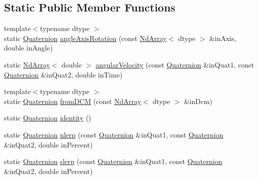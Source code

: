\subsection*{Static Public Member Functions}
\begin{DoxyCompactItemize}
\item 
{\footnotesize template$<$typename dtype $>$ }\\static \mbox{\hyperlink{class_num_c_1_1_rotations_1_1_quaternion}{Quaternion}} \mbox{\hyperlink{class_num_c_1_1_rotations_1_1_quaternion_a2c4e3aaf52ab55b71b07471411ad23bb}{angle\+Axis\+Rotation}} (const \mbox{\hyperlink{class_num_c_1_1_nd_array}{Nd\+Array}}$<$ dtype $>$ \&in\+Axis, double in\+Angle)
\item 
static \mbox{\hyperlink{class_num_c_1_1_nd_array}{Nd\+Array}}$<$ double $>$ \mbox{\hyperlink{class_num_c_1_1_rotations_1_1_quaternion_a850c8173ab8877ba42a8d440af26fcea}{angular\+Velocity}} (const \mbox{\hyperlink{class_num_c_1_1_rotations_1_1_quaternion}{Quaternion}} \&in\+Quat1, const \mbox{\hyperlink{class_num_c_1_1_rotations_1_1_quaternion}{Quaternion}} \&in\+Quat2, double in\+Time)
\item 
{\footnotesize template$<$typename dtype $>$ }\\static \mbox{\hyperlink{class_num_c_1_1_rotations_1_1_quaternion}{Quaternion}} \mbox{\hyperlink{class_num_c_1_1_rotations_1_1_quaternion_a6e66232a5f447ca48e865b2434bd0441}{from\+D\+CM}} (const \mbox{\hyperlink{class_num_c_1_1_nd_array}{Nd\+Array}}$<$ dtype $>$ \&in\+Dcm)
\item 
static \mbox{\hyperlink{class_num_c_1_1_rotations_1_1_quaternion}{Quaternion}} \mbox{\hyperlink{class_num_c_1_1_rotations_1_1_quaternion_a7823fd0bc7e9c2e64e2293e8956367f9}{identity}} ()
\item 
static \mbox{\hyperlink{class_num_c_1_1_rotations_1_1_quaternion}{Quaternion}} \mbox{\hyperlink{class_num_c_1_1_rotations_1_1_quaternion_a9d6996eb1a5a3e0fdeae32bf924bc578}{nlerp}} (const \mbox{\hyperlink{class_num_c_1_1_rotations_1_1_quaternion}{Quaternion}} \&in\+Quat1, const \mbox{\hyperlink{class_num_c_1_1_rotations_1_1_quaternion}{Quaternion}} \&in\+Quat2, double in\+Percent)
\item 
static \mbox{\hyperlink{class_num_c_1_1_rotations_1_1_quaternion}{Quaternion}} \mbox{\hyperlink{class_num_c_1_1_rotations_1_1_quaternion_a70f6f155f1be9ca15b4b1d36ba416c9b}{slerp}} (const \mbox{\hyperlink{class_num_c_1_1_rotations_1_1_quaternion}{Quaternion}} \&in\+Quat1, const \mbox{\hyperlink{class_num_c_1_1_rotations_1_1_quaternion}{Quaternion}} \&in\+Quat2, double in\+Percent)

\end{DoxyCompactItemize}

